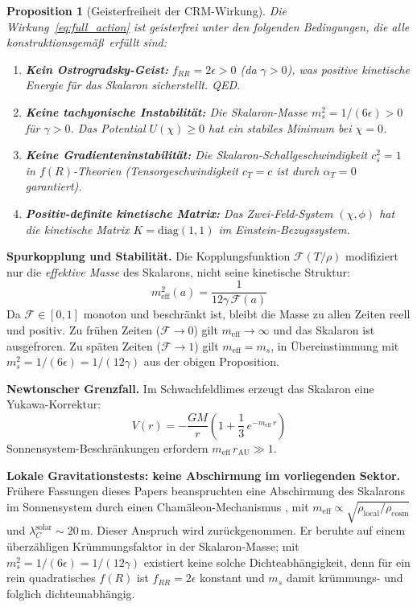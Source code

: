 \documentclass[11pt,a4paper]{article}
\newtheorem{proposition}{Proposition}
\begin{document}
\begin{proposition}[Geisterfreiheit der CRM-Wirkung]
Die Wirkung~\eqref{eq:full_action} ist geisterfrei unter den folgenden Bedingungen, die alle konstruktionsgem\"a\ss\ erf\"ullt sind:
\begin{enumerate}
\item \textbf{Kein Ostrogradsky-Geist:} $f_{RR} = 2\epsilon > 0$ (da $\gamma > 0$), was positive kinetische Energie f\"ur das Skalaron sicherstellt. QED.
\item \textbf{Keine tachyonische Instabilit\"at:} Die Skalaron-Masse $m_s^2 = 1/(6\epsilon) > 0$ f\"ur $\gamma > 0$. Das Potential $U(\chi) \geq 0$ hat ein stabiles Minimum bei $\chi = 0$.
\item \textbf{Keine Gradienteninstabilit\"at:} Die Skalaron-Schallgeschwindigkeit $c_s^2 = 1$ in $f(R)$-Theorien (Tensorgeschwindigkeit $c_T = c$ ist durch $\alpha_T = 0$ garantiert).
\item \textbf{Positiv-definite kinetische Matrix:} Das Zwei-Feld-System $(\chi, \phi)$ hat die kinetische Matrix $K = \mathrm{diag}(1, 1)$ im Einstein-Bezugssystem.
\end{enumerate}
\end{proposition}

\textbf{Spurkopplung und Stabilit\"at.} Die Kopplungsfunktion $\mathcal{F}(T/\rho)$ modifiziert nur die \textit{effektive Masse} des Skalarons, nicht seine kinetische Struktur:
\begin{equation}
m_{\mathrm{eff}}^2(a) = \frac{1}{12\gamma\,\mathcal{F}(a)}
\end{equation}
Da $\mathcal{F} \in [0,1]$ monoton und beschr\"ankt ist, bleibt die Masse zu allen Zeiten reell und positiv. Zu fr\"uhen Zeiten ($\mathcal{F} \to 0$) gilt $m_{\mathrm{eff}} \to \infty$ und das Skalaron ist ausgefroren. Zu sp\"aten Zeiten ($\mathcal{F} \to 1$) gilt $m_{\mathrm{eff}} = m_s$, in \"Ubereinstimmung mit $m_s^2 = 1/(6\epsilon) = 1/(12\gamma)$ aus der obigen Proposition.

\textbf{Newtonscher Grenzfall.} Im Schwachfeldlimes erzeugt das Skalaron eine Yukawa-Korrektur:
\begin{equation}
V(r) = -\frac{GM}{r}\left(1 + \frac{1}{3}\,e^{-m_{\mathrm{eff}}\,r}\right)
\label{eq:yukawa}
\end{equation}
Sonnensystem-Beschr\"ankungen erfordern $m_{\mathrm{eff}}\,r_{\mathrm{AU}} \gg 1$.

\textbf{Lokale Gravitationstests: keine Abschirmung im vorliegenden Sektor.} Fr\"uhere Fassungen dieses Papers beanspruchten eine Abschirmung des Skalarons im Sonnensystem durch einen Cham\"aleon-Mechanismus \cite{Khoury2004}, mit $m_{\mathrm{eff}} \propto \sqrt{\rho_{\mathrm{local}}/\rho_{\mathrm{cosm}}}$ und $\lambda_C^{\mathrm{solar}} \sim 20\,\mathrm{m}$. Dieser Anspruch wird zur\"uckgenommen. Er beruhte auf einem \"uberz\"ahligen Kr\"ummungsfaktor in der Skalaron-Masse; mit $m_s^2 = 1/(6\epsilon) = 1/(12\gamma)$ existiert keine solche Dichteabh\"angigkeit, denn f\"ur ein rein quadratisches $f(R)$ ist $f_{RR} = 2\epsilon$ konstant und $m_s$ damit kr\"ummungs- und folglich dichteunabh\"angig.
\end{document}
